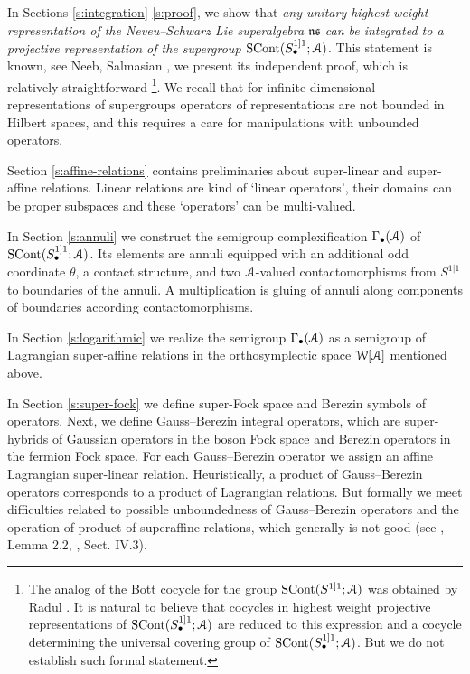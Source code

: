 \documentclass[]{amsart}
\def\cA{\EuScript A}
\def\cW{\EuScript W}
\def\SCont{\mathrm{SCont}}
\def\ns{\mathfrak{ns}}
\begin{document}
 In Sections \ref{s:integration}-\ref{s:proof}, we show that  {\it 
any unitary highest weight representation of the Neveu--Schwarz Lie superalgebra $\ns$ can be integrated to a projective representation of the supergroup
$\SCont(S^{1]1}_\bullet;\cA)$}. This statement is known, see
Neeb, Salmasian \cite{NeeS}, we present its independent proof,
which is relatively straightforward%
\footnote{The analog of the Bott cocycle for the group 
	$\SCont(S^{1]1};\cA)$ was obtained by Radul \cite{Rad}. 
	It is natural to believe that 
 cocycles in highest weight projective representations of $\SCont(S^{1]1}_\bullet;\cA)$ are reduced to this expression and  a cocycle determining
 the universal covering group of $\SCont(S^{1]1}_\bullet;\cA)$. 
 But we do not establish such formal statement.}. We recall that for infinite-dimensional representations of supergroups 
 operators of representations are not bounded in Hilbert spaces, and this requires a care for manipulations with unbounded operators. 
 
Section \ref{s:affine-relations} contains preliminaries
about super-linear and super-affine relations.
 Linear relations  are kind of \vphantom{.}`linear operators',
  their domains 
 can be proper subspaces and  these `operators' can be multi-valued.
 
 
 
In Section \ref{s:annuli} we construct the semigroup complexification
$\Gamma_\bullet(\cA)$
 of $\SCont(S^{1]1}_\bullet;\cA)$.
Its elements are annuli equipped with an additional odd coordinate $\theta$,
a contact structure, and two  $\cA$-valued contactomorphisms 
from $S^{1|1}$ to boundaries of the annuli. A multiplication is gluing of annuli along components of boundaries according 
contactomorphisms. 

In Section \ref{s:logarithmic} we realize the semigroup $\Gamma_\bullet(\cA)$
as a semigroup of Lagrangian super-affine relations in the orthosymplectic space $\cW[\cA]$ mentioned above.


In Section \ref{s:super-fock} we define super-Fock space and Berezin symbols
of operators. Next, we define Gauss--Berezin integral operators,
which are super-hybrids of Gaussian operators in the boson Fock
space and  Berezin operators in the fermion Fock space. For each Gauss--Berezin
operator we assign an affine Lagrangian super-linear relation. Heuristically,
a product of Gauss--Berezin operators corresponds to a product
of Lagrangian relations. But formally we meet  difficulties related to
possible unboundedness of Gauss--Berezin operators and 
the operation of product of superaffine relations, which generally is not good (see \cite{Ner-AA}, Lemma 2.2, \cite{Ner-book},  Sect. IV.3). 
 
\end{document}

